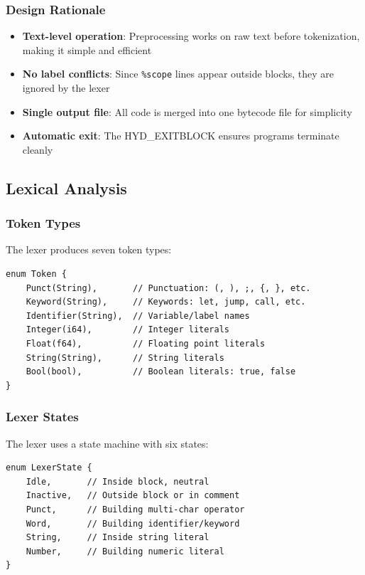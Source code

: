 \documentclass[11pt,a4paper]{article}
\begin{document}
\subsubsection{Design Rationale}

\begin{itemize}
    \item \textbf{Text-level operation}: Preprocessing works on raw text before tokenization, making it simple and efficient
    \item \textbf{No label conflicts}: Since \texttt{\%scope} lines appear outside blocks, they are ignored by the lexer
    \item \textbf{Single output file}: All code is merged into one bytecode file for simplicity
    \item \textbf{Automatic exit}: The HYD\_EXITBLOCK ensures programs terminate cleanly
\end{itemize}

\subsection{Lexical Analysis}

\subsubsection{Token Types}

The lexer produces seven token types:

\begin{lstlisting}[style=rustcode]
enum Token {
    Punct(String),       // Punctuation: (, ), ;, {, }, etc.
    Keyword(String),     // Keywords: let, jump, call, etc.
    Identifier(String),  // Variable/label names
    Integer(i64),        // Integer literals
    Float(f64),          // Floating point literals
    String(String),      // String literals
    Bool(bool),          // Boolean literals: true, false
}
\end{lstlisting}

\subsubsection{Lexer States}

The lexer uses a state machine with six states:

\begin{lstlisting}[style=rustcode]
enum LexerState {
    Idle,       // Inside block, neutral
    Inactive,   // Outside block or in comment
    Punct,      // Building multi-char operator
    Word,       // Building identifier/keyword
    String,     // Inside string literal
    Number,     // Building numeric literal
}
\end{lstlisting}
\end{document}
